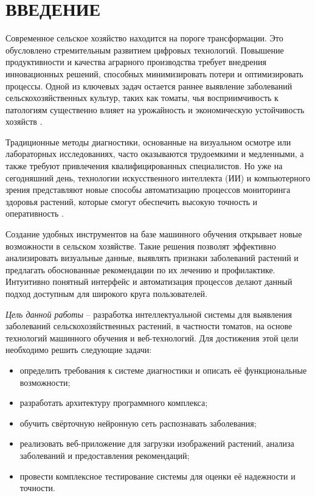 \section*{ВВЕДЕНИЕ}

Современное сельское хозяйство находится на пороге трансформации. Это обусловлено стремительным развитием цифровых технологий. Повышение продуктивности и качества аграрного производства требует внедрения инновационных решений, способных минимизировать потери и оптимизировать процессы. Одной из ключевых задач остается раннее выявление заболеваний сельскохозяйственных культур, таких как томаты, чья восприимчивость к патологиям существенно влияет на урожайность и экономическую устойчивость хозяйств \cite{plant8}.

Традиционные методы диагностики, основанные на визуальном осмотре или лабораторных исследованиях, часто оказываются трудоемкими и медленными, а также требуют привлечения квалифицированных специалистов. Но уже на сегодняшний день, технологии искусственного интеллекта (ИИ) и компьютерного зрения представляют новые способы автоматизацию процессов мониторинга здоровья растений, которые смогут обеспечить высокую точность и оперативность \cite{sh1}.

Создание удобных инструментов на базе машинного обучения открывает новые возможности в сельском хозяйстве. Такие решения позволят эффективно анализировать визуальные данные, выявлять признаки заболеваний растений и предлагать обоснованные рекомендации по их лечению и профилактике. Интуитивно понятный интерфейс и автоматизация процессов делают данный подход доступным для широкого круга пользователей.

\emph{Цель данной работы} -- разработка интеллектуальной системы для выявления заболеваний сельскохозяйственных растений, в частности томатов, на основе технологий машинного обучения и веб-технологий. Для достижения этой цели необходимо решить следующие задачи:

\begin{itemize}
	\item определить требования к системе диагностики и описать её функциональные возможности;
	\item разработать архитектуру программного комплекса;
	\item обучить свёрточную нейронную сеть распознавать заболевания;
	\item реализовать веб-приложение для загрузки изображений растений, анализа заболеваний и предоставления рекомендаций;
	\item провести комплексное тестирование системы для оценки её надежности и точности.
\end{itemize}

